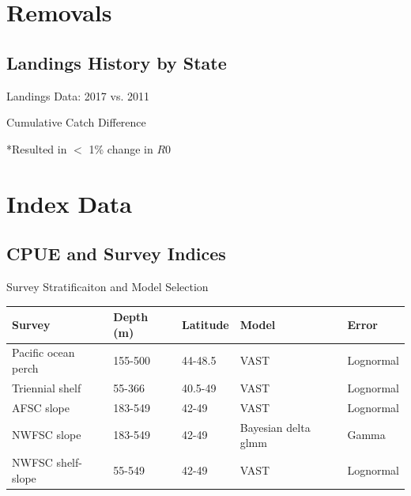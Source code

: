 \documentclass[pdf]{beamer}\usepackage[]{graphicx}\usepackage[]{color}
\begin{document}
\section{Removals}
\subsection{Landings History by State}
\begin{frame}{Landings Data: 2017 vs. 2011}
  \begin{center}
  \end{center}
\end{frame}

\begin{frame}{Cumulative Catch Difference}
  \begin{center}
  \end{center}
  *Resulted in $<$ 1\% change in $R0$ 
\end{frame}



\section{Index Data}

\subsection{CPUE and Survey Indices}
\begin{frame}{Survey Stratificaiton and Model Selection}
  \begin{table}[ht]
  \small
  \centering
  \begin{tabular}{p{1.15in}p{0.65in}p{0.5in}p{0.5in}p{0.75in}}
  Survey & Depth (m) & Latitude & Model & Error  \\ 
  \hline
  Pacific ocean perch & 155-500 & 44-48.5 & VAST & Lognormal \\
  Triennial shelf & 55-366 & 40.5-49 & VAST & Lognormal\\ 
  AFSC slope & 183-549 & 42-49 & VAST & Lognormal \\ 
  NWFSC slope & 183-549 & 42-49 & Bayesian delta glmm & Gamma \\
  NWFSC shelf-slope & 55-549 & 42-49 & VAST & Lognormal \\
  \hline
  \end{tabular}
  \end{table}
\end{frame}
\end{document}
